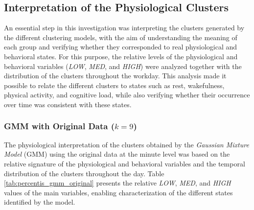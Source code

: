 \documentclass[a4paper,fleqn]{cas-sc}
\begin{document}
\subsection{Interpretation of the Physiological Clusters}

An essential step in this investigation was interpreting the clusters generated by the different clustering models, with the aim of understanding the meaning of each group and verifying whether they corresponded to real physiological and behavioral states. For this purpose, the relative levels of the physiological and behavioral variables (\textit{LOW}, \textit{MED}, and \textit{HIGH}) were analyzed together with the distribution of the clusters throughout the workday. This analysis made it possible to relate the different clusters to states such as rest, wakefulness, physical activity, and cognitive load, while also verifying whether their occurrence over time was consistent with these states.

\subsubsection{GMM with Original Data ($k=9$)}

The physiological interpretation of the clusters obtained by the \textit{Gaussian Mixture Model} (GMM) using the original data at the minute level was based on the relative signature of the physiological and behavioral variables and the temporal distribution of the clusters throughout the day. Table \ref{tab:percentis_gmm_original} presents the relative \textit{LOW}, \textit{MED}, and \textit{HIGH} values of the main variables, enabling characterization of the different states identified by the model.
\end{document}
